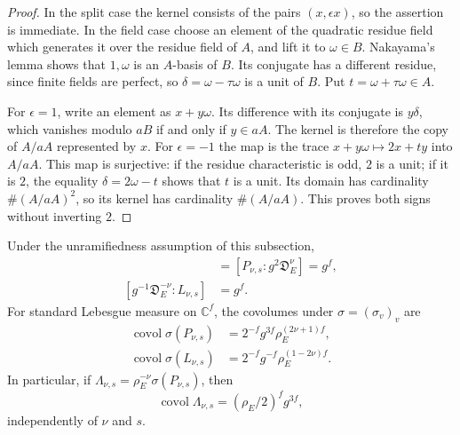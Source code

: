 \begin{proof}
In the split case the kernel consists of the pairs
$(x,\epsilon x)$, so the assertion is immediate.
In the field case choose an element of the quadratic residue
field which generates it over the residue field of $A$, and lift
it to $\omega\in B$.  Nakayama's lemma shows that
$1,\omega$ is an $A$-basis of $B$.  Its conjugate has a different
residue, since finite fields are perfect, so
$\delta=\omega-\tau\omega$ is a unit of $B$.
Put $t=\omega+\tau\omega\in A$.

For $\epsilon=1$, write an element as $x+y\omega$.
Its difference with its conjugate is $y\delta$, which vanishes
modulo $aB$ if and only if $y\in aA$.  The kernel is therefore
the copy of $A/aA$ represented by $x$.
For $\epsilon=-1$ the map is the trace
$x+y\omega\mapsto2x+ty$ into $A/aA$.
This map is surjective: if the residue characteristic is odd,
$2$ is a unit; if it is $2$, the equality
$\delta=2\omega-t$ shows that $t$ is a unit.
Its domain has cardinality $\#(A/aA)^2$, so its kernel has
cardinality $\#(A/aA)$.  This proves both signs without
inverting $2$.
\end{proof}

\begin{proposition}\label{gt-exact-covolumes}
Under the unramifiedness assumption of this subsection,
\begin{align}
 [g\mathfrak D_E^\nu:P_{\nu,s}]
    &=[P_{\nu,s}:g^2\mathfrak D_E^\nu]=g^f,
                 \label{gt-period-indices}\\
 [g^{-1}\mathfrak D_E^{-\nu}:L_{\nu,s}]&=g^f.
                 \label{gt-lift-index}
\end{align}
For standard Lebesgue measure on $\mathbb C^f$, the covolumes
under $\sigma=(\sigma_v)_v$ are
\begin{align}
 \operatorname{covol}\sigma(P_{\nu,s})
    &=2^{-f}g^{3f}\rho_E^{(2\nu+1)f},
                 \label{gt-period-covol}\\
 \operatorname{covol}\sigma(L_{\nu,s})
    &=2^{-f}g^{-f}\rho_E^{(1-2\nu)f}.
                 \label{gt-lift-covol}
\end{align}
In particular, if $\Lambda_{\nu,s}=\rho_E^{-\nu}
\sigma(P_{\nu,s})$, then
\begin{equation}\label{gt-normalized-covol}
 \operatorname{covol}\Lambda_{\nu,s}
      =(\rho_E/2)^f g^{3f},
\end{equation}
independently of $\nu$ and $s$.
\end{proposition}

